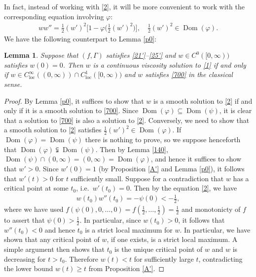 \documentclass[12pt]{article}
\numberwithin{equation}{section}
\theoremstyle{plain}
\newtheorem{lem}[thm]{Lemma}
\theoremstyle{definition}
\renewcommand{\phi}{\varphi}
\begin{document}
In fact, instead of working with \eqref{2}, it will be more convenient to work with the corresponding equation involving $\phi$:
\begin{align}\label{700}
ww'' = \frac{1}{2}(w')^2\bigg[1 - \phi\bigg(\frac{1}{2}(w')^2\bigg)\bigg], \quad \frac{1}{2}(w')^2 \in \operatorname{Dom}(\phi). 
\end{align}
We have the following counterpart to Lemma \ref{p0}:
\begin{lem}\label{p0'}
	Suppose that $(f,\Gamma)$ satisfies \eqref{21'}--\eqref{25'} and $w\in C^0([0,\infty))$ satisfies $w(0) = 0$. Then $w$ is a continuous viscosity solution to \eqref{1} if and only if $w\in C^\infty_{\operatorname{loc}}((0,\infty))\cap C^1_{\operatorname{loc}}([0,\infty))$ and $w$ satisfies \eqref{700} in the classical sense. 
\end{lem}
\begin{proof}
	By Lemma \ref{p0}, it suffices to show that $w$ is a smooth solution to \eqref{2} if and only if it is a smooth solution to \eqref{700}. Since $\operatorname{Dom}(\phi)\subseteq \operatorname{Dom}(\psi)$, it is clear that a solution to \eqref{700} is also a solution to \eqref{2}. Conversely, we need to show that a smooth solution to \eqref{2} satisfies $\frac{1}{2}(w')^2\in\operatorname{Dom}(\phi)$. If $\operatorname{Dom}(\phi) = \operatorname{Dom}(\psi)$ there is nothing to prove, so we suppose henceforth that $\operatorname{Dom}(\phi)\subsetneqq \operatorname{Dom}(\psi)$. Then by Lemma \ref{140}, $\operatorname{Dom}(\psi) \cap (0,\infty) = (0,\infty) = \operatorname{Dom}(\phi)$, and hence it suffices to show that $w'>0$. Since $w'(0) = 1$ (by Proposition \ref{A'} and Lemma \ref{p0}), it follows that $w'(t)>0$ for $t$ sufficiently small. Suppose for a contradiction that $w$ has a critical point at some $t_0$, i.e.~$w'(t_0)=0$. Then by the equation \eqref{2}, we have
	\begin{align*}
	w(t_0) w''(t_0) = - \psi(0) < -\frac{1}{2},
	\end{align*}
	where we have used $f(\psi(0),0,\dots,0) =f(\frac{1}{2}, \dots,\frac{1}{2}) = \frac{1}{2}$ and monotonicty of $f$ to assert that $\psi(0) > \frac{1}{2}$. In particular, since $w(t_0)>0$, it follows that $w''(t_0)<0$ and hence $t_0$ is a strict local maximum for $w$. In particular, we have shown that any critical point of $w$, if one exists, is a strict local maximum. A simple argument then shows that $t_0$ is the unique critical point of $w$ and $w$ is decreasing for $t>t_0$. Therefore $w(t) < t$ for sufficiently large $t$, contradicting the lower bound $w(t) \geq t$ from Proposition \ref{A'}. 
\end{proof}
\end{document}
